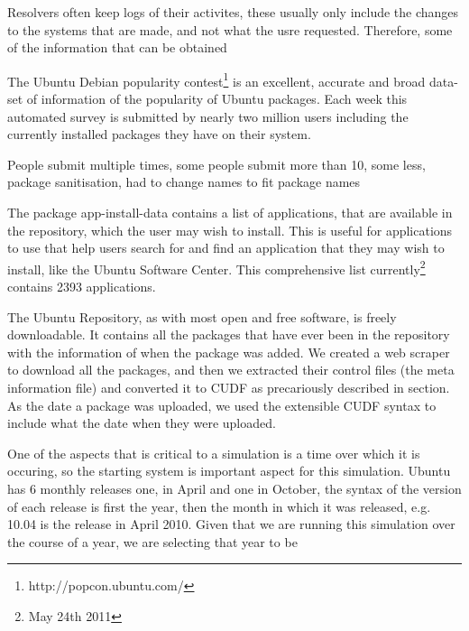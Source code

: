 Resolvers often keep logs of their activites, these usually only include the changes to the systems that are made, and not what the usre requested.
Therefore, some of the information that can be obtained

The Ubuntu Debian popularity contest\footnote{http://popcon.ubuntu.com/} is an excellent, accurate and broad data-set of information of the popularity of Ubuntu packages.
Each week this automated survey is submitted by nearly two million users including the currently installed packages they have on their system.

People submit multiple times, some people submit more than 10, some less, package sanitisation, had to change names to fit package names

The package app-install-data contains a list of applications, that are available in the repository, which the user may wish to install.
This is useful for applications to use that help users search for and find an application that they may wish to install, like the Ubuntu Software Center.
This comprehensive list currently\footnote{May 24th 2011} contains 2393 applications.

The Ubuntu Repository, as with most open and free software, is freely downloadable.
It contains all the packages that have ever been in the repository with the information of when the package was added.
We created a web scraper to download all the packages, and then we extracted their control files (the meta information file) and converted it to CUDF as precariously described in section. %
As the date a package was uploaded, we used the extensible CUDF syntax to include what the date when they were uploaded.

One of the aspects that is critical to a simulation is a time over which it is occuring, 
so the starting system is important aspect for this simulation.
Ubuntu has 6 monthly releases one, in April and one in October, the syntax of the version of each release is first the year,
then the month in which it was released, e.g. 10.04 is the release in April 2010.
Given that we are running this simulation over the course of a year, we are selecting that year to be 


